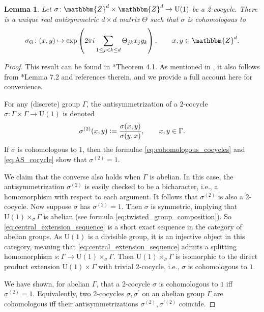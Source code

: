 \documentclass{amsart}
\numberwithin{figure}{section}
\numberwithin{equation}{section}
\numberwithin{table}{section}
\theoremstyle{plain}
\newtheorem{lemma}[equation]{Lemma}
\theoremstyle{definition}
\theoremstyle{remark}
\theoremstyle{nonumber}
\newcommand{\Z}{\mathbb{Z}}
\newcommand{\defeq}{\mathrel{\vcentcolon=}}
\renewcommand{\mathbb}{\mathbbm} %
\begin{document}
\begin{lemma}\label{lem:Zd_standard_cocycle}
Let $\sigma\colon \Z^d\times\Z^d\to\mathrm{U}(1)$ be a 2-cocycle. There is
a unique real antisymmetric $d\times d$ matrix $\Theta$ such that $\sigma$
is cohomologous to
\begin{equation}\label{eq:standard_2_cocycle}
\sigma_\Theta\colon (x,y)\mapsto \exp\left(2\pi i \sum_{1\leq j<k \leq d} \Theta_{jk}x_jy_k\right),\qquad x,y\in\Z^d.
\end{equation}
\end{lemma}
\begin{proof}
This result can be found in
\cite{Backhouse-Bradley:Projective_representations_space_groups}*{Theorem
4.1}. As mentioned in \cite{Hannabuss-Mathai-Thiang:T-duality_NC}, it also
follows from \cite{Kleppner:Multipliers_abelian_groups}*{Lemma 7.2} and
references therein, and we provide a full account here for convenience.

For any (discrete) group $\Gamma$, the antisymmetrization of a 2-cocycle
$\sigma\colon \Gamma\times\Gamma\to\mathrm{U}(1)$ is denoted
\begin{equation}\label{eq:AS_cocycle}
\sigma^{(2)}(x,y)\defeq \frac{\sigma(x,y)}{\sigma(y,x)},\qquad x,y\in\Gamma.
\end{equation}
If $\sigma$ is cohomologous to $1$, then the formulae \eqref{eq:cohomologous_cocycles} and \eqref{eq:AS_cocycle} show that $\sigma^{(2)}=1$. 

We claim that the converse also holds when $\Gamma$ is abelian. In this case, the antisymmetrization $\sigma^{(2)}$ is easily checked to be a bicharacter, i.e., a homomorphism with respect to each argument.
It follows that $\sigma^{(2)}$ is also a 2-cocycle.  Now suppose $\sigma$
has $\sigma^{(2)}=1$. Then $\sigma$ is symmetric, implying that
$\mathrm{U}(1)\times_\sigma \Gamma$ is abelian (see formula
\eqref{eq:twisted_group_composition}). So
\eqref{eq:central_extension_sequence} is a short exact sequence in the
category of abelian groups.  As $\mathrm{U}(1)$ is a divisible group, it is
an injective object in this category, meaning that
\eqref{eq:central_extension_sequence} admits a splitting homomorphism
$s\colon \Gamma\to \mathrm{U}(1)\times_\sigma \Gamma$. Then
$\mathrm{U}(1)\times_\sigma \Gamma$ is isomorphic to the direct product
extension $\mathrm{U}(1)\times \Gamma$ with trivial 2-cocycle, i.e.,
$\sigma$ is cohomologous to $1$.

We have shown, for abelian $\Gamma$, that a 2-cocycle $\sigma$ is cohomologous to $1$ iff $\sigma^{(2)}=1$. Equivalently, two 2-cocycles $\sigma,\sigma^\prime$ on an abelian group $\Gamma$ are cohomologous iff their antisymmetrizations $\sigma^{(2)},\sigma^{\prime(2)}$ coincide. 


\end{proof}
\end{document}

